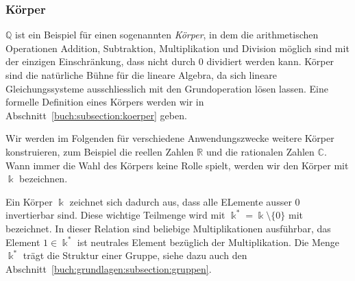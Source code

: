 \subsubsection{Körper}
$\mathbb{Q}$ ist ein Beispiel für einen sogenannten {\em Körper}, 
%
in dem die arithmetischen Operationen Addition, Subtraktion, Multiplikation
und Division möglich sind mit der einzigen Einschränkung, dass nicht durch
$0$ dividiert werden kann.
Körper sind die natürliche Bühne für die lineare Algebra, da sich lineare
Gleichungssysteme ausschliesslich mit den Grundoperation lösen lassen.
Eine formelle Definition eines Körpers werden wir in 
Abschnitt~\ref{buch:subsection:koerper} geben.

Wir werden im Folgenden für verschiedene Anwendungszwecke weitere Körper
konstruieren, zum Beispiel die reellen Zahlen $\mathbb{R}$ und die
rationalen Zahlen $\mathbb{C}$.
Wann immer die Wahl des Körpers keine Rolle spielt, werden wir den
Körper mit $\Bbbk$ bezeichnen.
%

Ein Körper $\Bbbk$ zeichnet sich dadurch aus, dass alle ELemente ausser $0$
invertierbar sind. 
Diese wichtige Teilmenge wird mit $\Bbbk^* = \Bbbk \setminus\{0\}$ mit
bezeichnet.
In dieser Relation sind beliebige Multiplikationen ausführbar, das Element
$1\in\Bbbk^*$ ist neutrales Element bezüglich der Multiplikation.
Die Menge $\Bbbk^*$ trägt die Struktur einer Gruppe, siehe dazu auch
den Abschnitt~\ref{buch:grundlagen:subsection:gruppen}.



